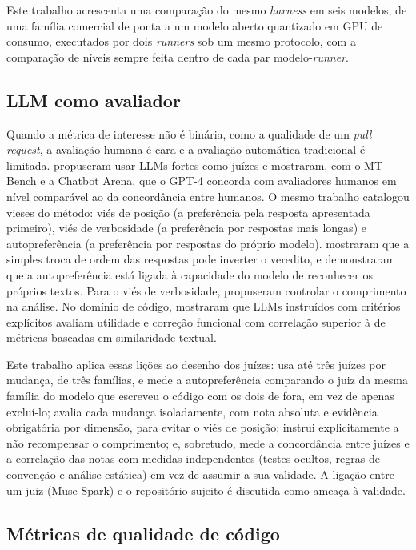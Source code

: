 Este trabalho acrescenta uma comparação do mesmo \textit{harness} em seis
modelos, de uma família comercial de ponta a um modelo aberto quantizado em
GPU de consumo, executados por dois \textit{runners} sob um mesmo protocolo,
com a comparação de níveis sempre feita dentro de cada par modelo-\textit{runner}.

\subsection{LLM como avaliador}
\label{sec:ref-juiz}

Quando a métrica de interesse não é binária, como a qualidade de um
\textit{pull request}, a avaliação humana é cara e a avaliação automática
tradicional é limitada.  propuseram usar LLMs
fortes como juízes e mostraram, com o MT-Bench e a Chatbot Arena, que o GPT-4
concorda com avaliadores humanos em nível comparável ao da concordância entre
humanos. O mesmo trabalho catalogou vieses do método: viés de posição (a
preferência pela resposta apresentada primeiro), viés de verbosidade (a
preferência por respostas mais longas) e autopreferência (a preferência por
respostas do próprio modelo).  mostraram que a simples
troca de ordem das respostas pode inverter o veredito, e
 demonstraram que a autopreferência está ligada
à capacidade do modelo de reconhecer os próprios textos. Para o viés de
verbosidade,  propuseram controlar o comprimento
na análise. No domínio de código,  mostraram que
LLMs instruídos com critérios explícitos avaliam utilidade e correção funcional
com correlação superior à de métricas baseadas em similaridade textual.

Este trabalho aplica essas lições ao desenho dos juízes: usa até três juízes
por mudança, de três famílias, e mede a autopreferência comparando o juiz da
mesma família do modelo que escreveu o código com os dois de fora, em vez de
apenas excluí-lo; avalia cada mudança isoladamente, com nota absoluta e
evidência obrigatória por dimensão, para evitar o viés de posição; instrui
explicitamente a não recompensar o comprimento; e, sobretudo, mede a
concordância entre juízes e a correlação das notas com medidas independentes
(testes ocultos, regras de convenção e análise estática) em vez de assumir a
sua validade. A ligação entre um juiz (Muse Spark) e o repositório-sujeito é
discutida como ameaça à validade.

\subsection{Métricas de qualidade de código}
\label{sec:ref-qualidade}

